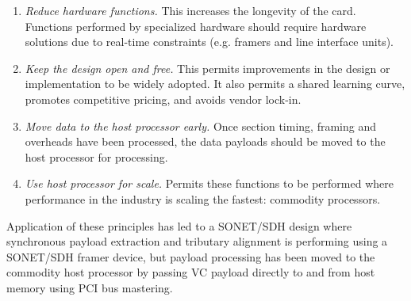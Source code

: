 \documentclass[letterpaper,final,notitlepage,twocolumn,10pt,twoside]{article}
\makeatletter
\let\normalsize = \small
\let\small = \footnotesize
\let\footnotesize = \scriptsize
\let\scriptsize = \tiny
\renewcommand\subsubsection{\@startsection{subsubsection}{3}{\z@}%
                                     {-1.25ex\@plus -.5ex \@minus -.2ex}%
                                     {1ex \@plus .2ex}%
                                     {\normalfont\normalsize\bfseries}}
\makeatother
\begin{document}
\begin{enumerate}
	\item \textsl{Reduce hardware functions.}
		This increases the longevity of the card.  Functions performed
		by specialized hardware should require hardware solutions due to
		real-time constraints (e.g. framers and line interface units).
	\item \textsl{Keep the design open and free.}
		This permits improvements in the design or implementation to be
		widely adopted.  It also permits a shared learning curve,
		promotes competitive pricing, and avoids vendor lock-in.
	\item \textsl{Move data to the host processor early.}
		Once section timing, framing and overheads have been processed,
		the data payloads should be moved to the host processor for
		processing.
	\item \textsl{Use host processor for scale.}
		Permits these functions to be performed where performance in the
		industry is scaling the fastest: commodity processors.
\end{enumerate}

Application of these principles has led to a SONET/SDH design where synchronous
payload extraction and tributary alignment is performing using a SONET/SDH
framer device, but payload processing has been moved to the commodity host
processor by passing VC payload directly to and from host memory using PCI bus
mastering.

% 
\end{document}
